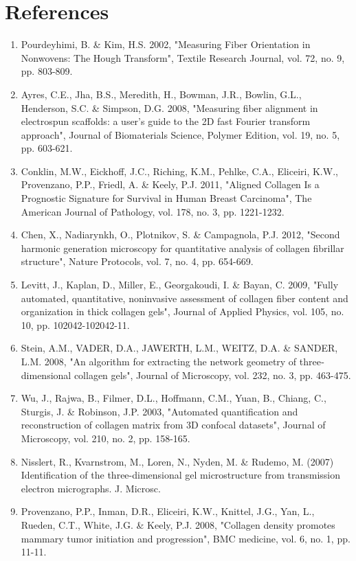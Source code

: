 \documentclass[12pt,a4paper]{article}
\begin{document}
\section{References}
\begin{enumerate}
\item Pourdeyhimi, B. \& Kim, H.S. 2002, "Measuring Fiber Orientation in Nonwovens: The Hough Transform", Textile Research Journal, vol. 72, no. 9, pp. 803-809.
\item Ayres, C.E., Jha, B.S., Meredith, H., Bowman, J.R., Bowlin, G.L., Henderson, S.C. \& Simpson, D.G. 2008, "Measuring fiber alignment in electrospun scaffolds: a user's guide to the 2D fast Fourier transform approach", Journal of Biomaterials Science, Polymer Edition, vol. 19, no. 5, pp. 603-621.
\item Conklin, M.W., Eickhoff, J.C., Riching, K.M., Pehlke, C.A., Eliceiri, K.W., Provenzano, P.P., Friedl, A. \& Keely, P.J. 2011, "Aligned Collagen Is a Prognostic Signature for Survival in Human Breast Carcinoma", The American Journal of Pathology, vol. 178, no. 3, pp. 1221-1232.
\item Chen, X., Nadiarynkh, O., Plotnikov, S. \& Campagnola, P.J. 2012, "Second harmonic generation microscopy for quantitative analysis of collagen fibrillar structure", Nature Protocols, vol. 7, no. 4, pp. 654-669.
\item Levitt, J., Kaplan, D., Miller, E., Georgakoudi, I. \& Bayan, C. 2009, "Fully automated, quantitative, noninvasive assessment of collagen fiber content and organization in thick collagen gels", Journal of Applied Physics, vol. 105, no. 10, pp. 102042-102042-11.
\item Stein, A.M., VADER, D.A., JAWERTH, L.M., WEITZ, D.A. \& SANDER, L.M. 2008, "An algorithm for extracting the network geometry of three‐dimensional collagen gels", Journal of Microscopy, vol. 232, no. 3, pp. 463-475.
\item Wu, J., Rajwa, B., Filmer, D.L., Hoffmann, C.M., Yuan, B., Chiang, C., Sturgis, J. \& Robinson, J.P. 2003, "Automated quantification and reconstruction of collagen matrix from 3D confocal datasets", Journal of Microscopy, vol. 210, no. 2, pp. 158-165.
\item Nisslert, R., Kvarnstrom, M., Loren, N., Nyden, M. \& Rudemo, M. (2007) Identification of the three-dimensional gel microstructure from transmission electron micrographs. J. Microsc.
\item Provenzano, P.P., Inman, D.R., Eliceiri, K.W., Knittel, J.G., Yan, L., Rueden, C.T., White, J.G. \& Keely, P.J. 2008, "Collagen density promotes mammary tumor initiation and progression", BMC medicine, vol. 6, no. 1, pp. 11-11.

\end{enumerate}
\end{document}
